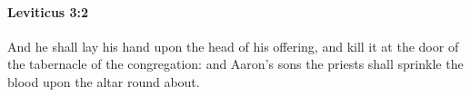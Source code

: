 
		\paragraph{Leviticus 3:2} %
			\label{LEVITICUS-3-2}

			And he shall lay his hand upon the head of his offering, and kill it at the door of the tabernacle of the congregation: and Aaron’s sons the priests shall sprinkle the blood upon the altar round about.



